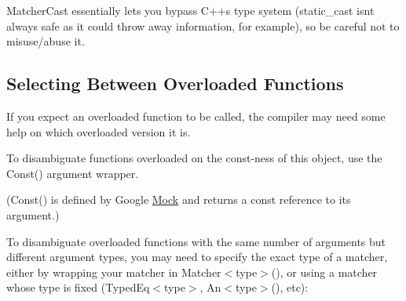 {\ttfamily Matcher\+Cast} essentially lets you bypass C++\textquotesingle{}s type system ({\ttfamily static\+\_\+cast} isn\textquotesingle{}t always safe as it could throw away information, for example), so be careful not to misuse/abuse it.

\subsection*{Selecting Between Overloaded Functions}

If you expect an overloaded function to be called, the compiler may need some help on which overloaded version it is.

To disambiguate functions overloaded on the const-\/ness of this object, use the {\ttfamily Const()} argument wrapper.


\begin{DoxyCode}{0}
\DoxyCodeLine{}
\DoxyCodeLine{\};}
\DoxyCodeLine{}
\end{DoxyCode}


({\ttfamily Const()} is defined by Google \mbox{\hyperlink{class_mock}{Mock}} and returns a {\ttfamily const} reference to its argument.)

To disambiguate overloaded functions with the same number of arguments but different argument types, you may need to specify the exact type of a matcher, either by wrapping your matcher in {\ttfamily Matcher$<$type$>$()}, or using a matcher whose type is fixed ({\ttfamily Typed\+Eq$<$type$>$}, {\ttfamily An$<$type$>$()}, etc)\+:


\begin{DoxyCode}{0}
\DoxyCodeLine{}
\DoxyCodeLine{\};}
\DoxyCodeLine{}
\DoxyCodeLine{}
\DoxyCodeLine{}
\DoxyCodeLine{\}}
\end{DoxyCode}


